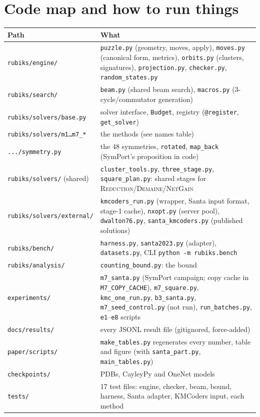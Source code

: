 \documentclass[10.5pt,a4paper]{article}
\newcommand{\M}[1]{\textsc{#1}}
\begin{document}
\section{Code map and how to run things}
\begin{center}\small
\begin{tabularx}{\textwidth}{@{}lX@{}}
\toprule
Path & What \\
\midrule
\texttt{rubiks/engine/} & \texttt{puzzle.py} (geometry, moves, apply), \texttt{moves.py} (canonical form, metrics),
\texttt{orbits.py} (clusters, signatures), \texttt{projection.py}, \texttt{checker.py}, \texttt{random\_states.py} \\
\texttt{rubiks/search/} & \texttt{beam.py} (shared beam search), \texttt{macros.py} (3-cycle/commutator generation) \\
\texttt{rubiks/solvers/base.py} & solver interface, \texttt{Budget}, registry (\texttt{@register}, \texttt{get\_solver}) \\
\texttt{rubiks/solvers/m1\ldots m7\_*} & the methods (see names table) \\
\texttt{.../symmetry.py} & the 48 symmetries, \texttt{rotated}, \texttt{map\_back} (SymPort's proposition in code) \\
\texttt{rubiks/solvers/} (shared) & \texttt{cluster\_tools.py}, \texttt{three\_stage.py}, \texttt{square\_plan.py}: shared
stages for \M{Reduction}/\M{Demaine}/\M{NetGain} \\
\texttt{rubiks/solvers/external/} & \texttt{kmcoders\_run.py} (wrapper, Santa input format, stage-1 cache), \texttt{nxopt.py}
(server pool), \texttt{dwalton76.py}, \texttt{santa\_kmcoders.py} (published solutions) \\
\texttt{rubiks/bench/} & \texttt{harness.py}, \texttt{santa2023.py} (adapter), \texttt{datasets.py}, CLI \texttt{python -m rubiks.bench} \\
\texttt{rubiks/analysis/} & \texttt{counting\_bound.py}: the bound \\
\texttt{experiments/} & \texttt{m7\_santa.py} (SymPort campaign; copy cache in \texttt{M7\_COPY\_CACHE}),
\texttt{m7\_square.py}, \texttt{kmc\_one\_run.py}, \texttt{b3\_santa.py}, \texttt{m7\_seed\_control.py} (not run),
\texttt{run\_batches.py}, \texttt{e1}--\texttt{e8} scripts \\
\texttt{docs/results/} & every JSONL result file (gitignored, force-added) \\
\texttt{paper/scripts/} & \texttt{make\_tables.py} regenerates every number, table and figure (with \texttt{santa\_part.py},
\texttt{main\_tables.py}) \\
\texttt{checkpoints/} & PDBs, CayleyPy and OneNet models \\
\texttt{tests/} & 17 test files: engine, checker, beam, bound, harness, Santa adapter, KMCoders input, each method \\
\bottomrule
\end{tabularx}
\end{center}
\end{document}
